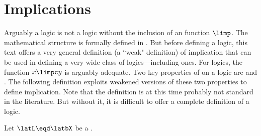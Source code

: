 \section{Implications}
Arguably a logic is not a logic without the inclusion of an  function $\limp$.
The mathematical structure  is formally defined in .
But before defining a logic, this text offers a very general definition 
(a ``weak" definition) of implication that can be used in defining a very wide class
of logics---including  ones.
For  logics, the  function 
$x\limpc y$  is arguably adequate.
Two key properties of  on a  logic
are  and . %
The following definition exploits weakened versions of these two properties
to define implication.
Note that the definition is at this time probably not standard in the literature. 
But without it, it is difficult to offer a complete definition of a logic.

\begin{definition}
\label{def:limp}
Let $\latL\eqd\latbX$ be a  .
\end{definition}

